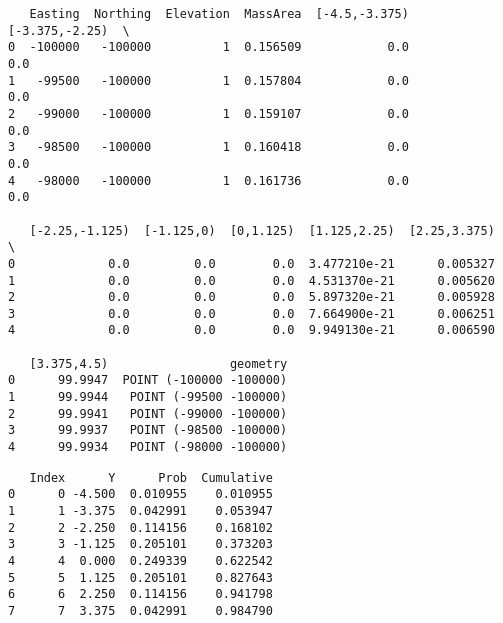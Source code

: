 \documentclass[11pt]{article}
\begin{document}
    
    
    \begin{verbatim}
   Easting  Northing  Elevation  MassArea  [-4.5,-3.375)  [-3.375,-2.25)  \
0  -100000   -100000          1  0.156509            0.0             0.0   
1   -99500   -100000          1  0.157804            0.0             0.0   
2   -99000   -100000          1  0.159107            0.0             0.0   
3   -98500   -100000          1  0.160418            0.0             0.0   
4   -98000   -100000          1  0.161736            0.0             0.0   

   [-2.25,-1.125)  [-1.125,0)  [0,1.125)  [1.125,2.25)  [2.25,3.375)  \
0             0.0         0.0        0.0  3.477210e-21      0.005327   
1             0.0         0.0        0.0  4.531370e-21      0.005620   
2             0.0         0.0        0.0  5.897320e-21      0.005928   
3             0.0         0.0        0.0  7.664900e-21      0.006251   
4             0.0         0.0        0.0  9.949130e-21      0.006590   

   [3.375,4.5)                 geometry  
0      99.9947  POINT (-100000 -100000)  
1      99.9944   POINT (-99500 -100000)  
2      99.9941   POINT (-99000 -100000)  
3      99.9937   POINT (-98500 -100000)  
4      99.9934   POINT (-98000 -100000)  
    \end{verbatim}

    
    
    \begin{verbatim}
   Index      Y      Prob  Cumulative
0      0 -4.500  0.010955    0.010955
1      1 -3.375  0.042991    0.053947
2      2 -2.250  0.114156    0.168102
3      3 -1.125  0.205101    0.373203
4      4  0.000  0.249339    0.622542
5      5  1.125  0.205101    0.827643
6      6  2.250  0.114156    0.941798
7      7  3.375  0.042991    0.984790
    \end{verbatim}
\end{document}
